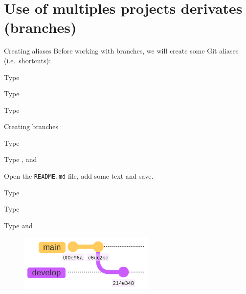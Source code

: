 \documentclass[10pt]{beamer}
\begin{document}
\section{Use of multiples projects derivates (branches)}

\begin{frame}[fragile]{Creating aliases}
\protect\hypertarget{creating-aliases}{}
Before working with branches, we will create some Git aliases (i.e.~shortcuts):

Type

Type 

Type 

\end{frame}


\begin{frame}[fragile]{Creating branches}
\protect\hypertarget{creating-branches}{}

Type 

Type ,  and 

Open the \texttt{README.md} file, add some text and save.

Type 

Type 

Type  and 


\begin{figure}[H]

{\centering \includegraphics[width=0.6\textwidth]{mermaid/mermaid-figure-8.png}

}

\end{figure}
\end{frame}
\end{document}
